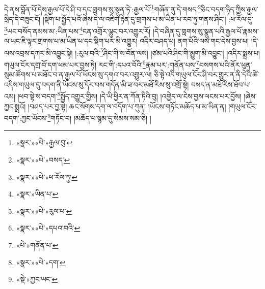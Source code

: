 དེ་ནས་བློན་པོ་དེས་རྒྱལ་པོ་དེ་ཤི་བ་དང་གླགས་སུ་སྣུན་ཏེ་:རྒྱལ་པོ་\footnote{«སྣར་»«པེ་»རྒྱལ་བུ་}གཞོན་ནུ་དེ་གསད་\footnote{«སྣར་»«པེ་»བསད་}ཅིང་བདག་ཉིད་ཀྱིས་རྒྱལ་སྲིད་དེ་བཟུང་ངོ། །སྡིག་པ་སྤྱོད་པའོ་ཞེས་དེ་ལ་འཇིག་རྟེན་དུ་གྲགས་པ་མ་ཡིན་པ་རབ་ཏུ་གནས་ཤིང་། :ཕ་རོལ་དུ་\footnote{«སྣར་»«པེ་»ཕ་རོལ་ཏུ་}ཡང་བསོད་ནམས་མ་:ཡིན་པས་\footnote{«སྣར་»ཡིན་པ་}ངན་འགྲོར་ལྷུང་བར་འགྱུར་རོ། །དེ་བཞིན་དུ་གླགས་སུ་སྣུན་པའི་རྒྱལ་པོ་རྣམས་ལ་ཡང་ཇི་ལྟར་གྲགས་པ་མ་ཡིན་པ་དང་སྡིག་པར་མི་འགྱུར། འདིར་བཤད་པ། ནག་པོའི་ལས་གང་དེས་བྱས་པ། །དེ་ལས་འབྲས་དཀར་མི་འབྱུང་སྟེ། །:རུལ་བའི་\footnote{«སྣར་»«པེ་»རུལ་པ་}ཤིང་གི་ས་བོན་ལས། །ཙམ་པའི་ཤིང་གི་མྱུག་མི་འབྱུང་། །འདིར་སྨྲས་པ། གཡུལ་ངོར་དགྲ་བོ་དག་ཕམ་པར་བྱས་ཏེ། རང་གི་:དཔའ་བོའི་\footnote{«སྣར་»«པེ་»དཔའ་བའི་}རྣམ་པར་:གནོན་པས་\footnote{«པེ་»གནོན་པ་}བསགས་པའི་ནོར་ཕུན་སུམ་ཚོགས་པ་མཐོང་བ་ན་རྒྱལ་པོ་ཡོངས་སུ་དགའ་བར་འགྱུར་ལ། ཅི་སྟེ་འདི་གཡུལ་ངོར་ཤི་བར་གྱུར་ན་ནི་དེའི་ཚེ་འདིས་གཡུལ་དུ་བདག་ནི་ཡོངས་སུ་དོར་བས་གདོན་མི་ཟ་བར་མཐོ་རིས་སུ་འགྲོ་སྟེ། བསད་ན་མཐོ་རིས་ཐོབ་པ་འམ། །ཕབ་སྟེ་ས་བདག་\footnote{«སྣར་»«པེ་»དག་}སྤྱོད་འགྱུར་གྱིས། །དེ་ཡི་ཕྱིར་ན་ཀོན་ཏིའི་བུ། །འགྱེད་ལ་ངེས་བྱས་ལངས་པར་བྱོས། །ཞེས་ཀྱང་སྨྲའོ། །བཤད་པར་བྱ་སྟེ། ཆང་སོགས་དག་ལ་བདོག་པ་ཀུན། །ཡོངས་གཏོང་མཆོད་པ་མ་ཡིན་ན། །གཡུལ་ངོར་བདག་:ཀྱང་ཡོངས་\footnote{«སྡེ་»ཀྱང་ཡང་}གཏོང་བ། །མཆོད་པ་སྙམ་དུ་སེམས་སམ་ཅི། །
